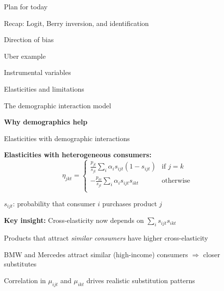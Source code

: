 \documentclass[notes,11pt, aspectratio=169]{beamer}
\newenvironment{wideitemize}{\itemize\addtolength{\itemsep}{10pt}}{\enditemize}
\newenvironment{wideenumerate}{\enumerate\addtolength{\itemsep}{10pt}}{\endenumerate}
\begin{document}
\begin{frame}{Plan for today}
  \begin{wideenumerate}
    \item Recap: Logit, Berry inversion, and identification
    \item Direction of bias
    \item Uber example
    \item Instrumental variables
    \item Elasticities and limitations
    \item The demographic interaction model
    \item \textbf{Why demographics help}
  \end{wideenumerate}
\end{frame}

\begin{frame}{Elasticities with demographic interactions}
	\begin{wideitemize}
		\item \textbf{Elasticities with heterogeneous consumers:}
		\[  \eta_{jkt} =  \left\{
		\begin{array}{ll}
		\frac{p_{jt}}{s_{jt}} \sum_i \alpha_i s_{ijt} (1-s_{ijt}) & \text{if } j=k \\[8pt]
		-\frac{p_{kt}}{s_{jt}} \sum_i \alpha_i s_{ijt} s_{ikt} & \text{otherwise} \\
		\end{array}
		\right. \]
		\item $s_{ijt}$: probability that consumer $i$ purchases product $j$
		\item \textbf{Key insight:} Cross-elasticity now depends on $\sum_i s_{ijt} s_{ikt}$
		\begin{wideitemize}
			\item Products that attract \textit{similar consumers} have higher cross-elasticity
			\item BMW and Mercedes attract similar (high-income) consumers $\Rightarrow$ closer substitutes
		\end{wideitemize}
		\item Correlation in $\mu_{ijt}$ and $\mu_{ikt}$ drives realistic substitution patterns
	\end{wideitemize}
\end{frame}
\end{document}
